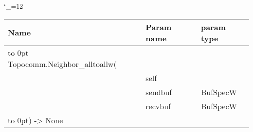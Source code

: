 \begingroup \catcode`\_=12 \tt
\begin{tabular}{lll}
\toprule
\textrm{Name}&\textrm{Param name}&\textrm{param type}\\
\midrule
\hbox to 0pt {Topocomm.Neighbor_alltoallw(\hss}\\
& self\\
& sendbuf & BufSpecW\\
& recvbuf & BufSpecW\\
\hbox to 0pt{) -> None\hss}\\
\bottomrule
\end{tabular}
\endgroup

